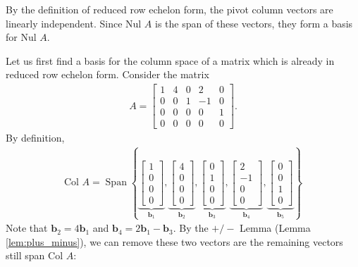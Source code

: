 \documentclass[12pt,letterpaper,reqno]{article}
\numberwithin{equation}{section}
\newcommand{\Nul}{\text{Nul }}
\newcommand{\Col}{\text{Col }}
\DeclareMathOperator{\Span}{Span}
\begin{document}
\begin{pf}
By the definition of reduced row echelon form, the pivot column vectors are linearly independent. Since $\Nul A$ is the span of these vectors, they form a basis for $\Nul A$.	
\end{pf}


\begin{example}
Let us first find a basis for the column space of a matrix which is already in reduced row echelon form. Consider the matrix
\begin{align*}
	A=\begin{bmatrix}
		1 & 4 & 0 & 2 & 0 \\
		0 & 0 & 1 & -1 & 0 \\
		0 & 0 & 0 & 0 & 1 \\
		0 & 0 & 0 & 0 & 0
	\end{bmatrix}.
\end{align*}
By definition,
\begin{align*}
	\Col A=\Span \left\{\underbrace{\begin{bmatrix}
		1 \\ 0 \\ 0 \\0
	\end{bmatrix}}_{\mathbf{b}_1}, \underbrace{\begin{bmatrix}
		4 \\ 0 \\ 0 \\0
	\end{bmatrix}}_{\mathbf{b}_2}, \underbrace{\begin{bmatrix}
		0 \\ 1 \\ 0 \\0
	\end{bmatrix}}_{\mathbf{b}_3}, \underbrace{\begin{bmatrix}
		2 \\ -1 \\ 0 \\0
	\end{bmatrix}}_{\mathbf{b}_4}, \underbrace{\begin{bmatrix}
		0 \\ 0 \\ 1 \\0
	\end{bmatrix}}_{\mathbf{b}_5} \right\}
\end{align*}
Note that $\mathbf{b}_2=4\mathbf{b}_1$ and $\mathbf{b}_4=2\mathbf{b}_1-\mathbf{b}_3$. By the $+/-$ Lemma (Lemma \ref{lem:plus_minus}), we can remove these two vectors are the remaining vectors still span $\Col A$:

\end{example}
\end{document}
